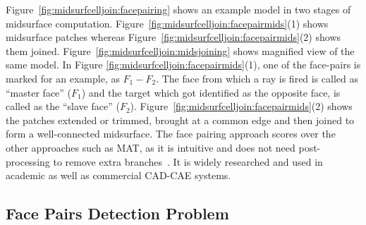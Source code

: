 Figure~\ref{fig:midsurfcelljoin:facepairing} shows an example model in two stages of midsurface computation. Figure~\ref{fig:midsurfcelljoin:facepairmids}(1) shows midsurface patches whereas Figure~\ref{fig:midsurfcelljoin:facepairmids}(2) shows them joined. Figure~\ref{fig:midsurfcelljoin:midsjoining} shows magnified view of the same model. In Figure \ref{fig:midsurfcelljoin:facepairmids}(1), one of the face-pairs is marked for an example, as $F_1-F_2$. The face from which a ray is fired is called as ``master face'' ($F_1$) and the target which got identified as the opposite face, is called as the ``slave face'' ($F_2$). Figure~\ref{fig:midsurfcelljoin:facepairmids}(2) shows the patches extended or trimmed, brought at a common edge and then joined to form a well-connected midsurface. 
 The face pairing approach scores over the other approaches such as MAT, as it is intuitive and does not need post-processing to remove extra branches~\cite{Rezayat1996}. It is widely researched and used in academic as well as commercial CAD-CAE systems.


	
\subsection{Face Pairs Detection Problem}  \label{sec:midsurfcelljoin:facepairdetection}

